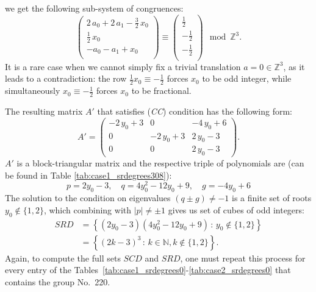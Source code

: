 % 
we get the following sub-system of congruences:
$$
\left(\begin{array}{r}
2 \, a_{0} + 2 \, a_{1} - \frac{3}{2} \, x_{0} \\
\frac{1}{2} \, x_{0} \\
-a_{0} - a_{1} + x_{0} \\
\end{array}\right) \equiv
\left(\begin{array}{r}
\frac{1}{2} \\
-\frac{1}{2} \\
-\frac{1}{2} \\
\end{array}\right) \mod \mathbb{Z}^3.
$$
It is a rare case when we cannot simply fix a trivial translation $a = 0 \in \mathbb{Z}^3$, as it leads to a
contradiction: the row $\frac{1}{2}x_0 \equiv -\frac{1}{2}$ forces $x_0$ to be odd integer,
while simultaneously $x_0 \equiv -\frac{1}{2}$ forces $x_0$ to be fractional.

The resulting matrix $A'$ that satisfies (\textit{CC}) condition has the following form:
$$A' = \left(\begin{array}{rrr}
-2 \, y_{0} + 3 & 0 & -4 \, y_{0} + 6 \\
0 & -2 \, y_{0} + 3 & 2 \, y_{0} - 3 \\
0 & 0 & 2 \, y_{0} - 3
\end{array}\right).$$
$A'$ is a block-triangular matrix and the respective triple of polynomials are (can be found in Table \ref{tab:case1_srdegrees308}):
$$ p = 2y_0 - 3, \quad q = 4y_0^2 - 12y_{0} + 9, \quad g = -4y_0 + 6 $$
The solution to the condition on eigenvalues $(q\pm g) \neq -1$ is a finite set of roots $y_0 \notin \{1, 2\}$, which
combining with $|p| \neq \pm 1$ gives us set of cubes of odd integers:
\begin{align*}
  SRD &= \left\{ (2y_0 - 3)(4y_0^2 - 12y_{0} + 9) \, : \, y_0 \notin \{1, 2\} \right\} \\
  &= \left\{ (2k - 3)^3 \, : \, k \in \mathbb{N}, k \notin \{1, 2\} \right\}.
\end{align*}
Again, to compute the full sets $SCD$ and $SRD$, one must repeat this process
for every entry of the Tables~\ref{tab:case1_srdegrees0}-\ref{tab:case2_srdegrees0} that contains the group No.~220.
